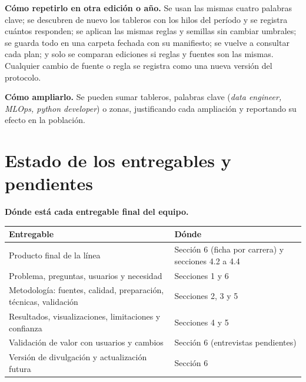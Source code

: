 \documentclass[11pt,a4paper]{article}
\begin{document}
\textbf{Cómo repetirlo en otra edición o año.} Se usan las mismas cuatro palabras clave; se descubren de nuevo los tableros con los hilos del período y se registra cuántos responden; se aplican las mismas reglas y semillas sin cambiar umbrales; se guarda todo en una carpeta fechada con su manifiesto; se vuelve a consultar cada plan; y solo se comparan ediciones si reglas y fuentes son las mismas. Cualquier cambio de fuente o regla se registra como una nueva versión del protocolo.

\textbf{Cómo ampliarlo.} Se pueden sumar tableros, palabras clave (\emph{data engineer, MLOps, python developer}) o zonas, justificando cada ampliación y reportando su efecto en la población.

\clearpage
\section{Estado de los entregables y pendientes}\label{sec:estado}
\textbf{Dónde está cada entregable final del equipo.}
\begin{table}[H]
\centering\small
\begin{tabularx}{\textwidth}{L{6.4cm} X}
\toprule
{}\textbf{Entregable} & \textbf{Dónde}\\
\midrule
Producto final de la línea & Sección 6 (ficha por carrera) y secciones 4.2 a 4.4\\
Problema, preguntas, usuarios y necesidad & Secciones 1 y 6\\
Metodología: fuentes, calidad, preparación, técnicas, validación & Secciones 2, 3 y 5\\
Resultados, visualizaciones, limitaciones y confianza & Secciones 4 y 5\\
Validación de valor con usuarios y cambios & Sección 6 (entrevistas pendientes)\\
Versión de divulgación y actualización futura & Sección 6\\
\bottomrule
\end{tabularx}
\end{table}
\end{document}
